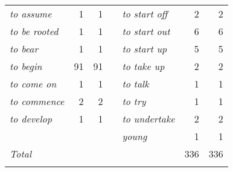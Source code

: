 \begin{table}
\begin{tabularx}{\textwidth}{>{\itshape}lrrX>{\itshape}lrr}
 to assume &  1 &  1                         & & to start off &  2 &  2\\
 to be rooted &  1 &  1                      & & to start out &  6 &  6\\
 to bear &  1 &  1                           & & to start up &  5 &  5\\
 to begin &  91 &  91                        & & to take up &  2 &  2\\
 to come on &  1 &  1                        & & to talk &  1 &  1\\
 to commence &  2 &  2                       & & to try &  1 &  1\\
 to develop &  1 &  1                        & & to undertake &  2 &  2\\
            &    &                           & & young &  1 &  1\\\midrule 
 \normalfont Total   &      &                &          &  &  336 &  336\\\lspbottomrule
\end{tabularx}                                 
\end{table}


